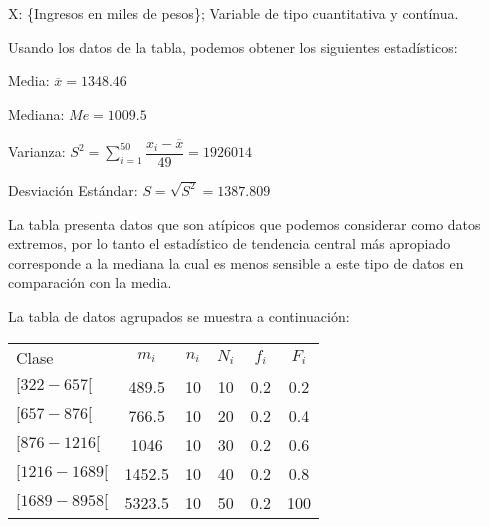 \begin{solution}
X: \{Ingresos en miles de pesos\}; Variable de tipo cuantitativa y contínua.

Usando los datos de la tabla, podemos obtener los siguientes estadísticos:

Media: $\overline{x}=1348.46$

Mediana: $Me=1009.5$

Varianza: $S^2 = \sum_{i=1}^{50} \dfrac{x_i - \overline{x}}{49}= 1926014$

Desviación Estándar: $S=\sqrt{S^2}=1387.809$

La tabla presenta datos que son atípicos que podemos considerar como datos extremos, por lo tanto el estadístico de tendencia central más apropiado corresponde a la mediana la cual es menos sensible a este tipo de datos en comparación con la media.

La tabla de datos agrupados se muestra a continuación:


\begin{center}
\begin{tabular}{lccccc}
Clase           & $m_i$  & $n_i$ & $N_i$ & $f_i$ & $F_i$ \\
$[322 - 657[$   & 489.5  & 10    & 10    & 0.2   & 0.2   \\
$[657 - 876[$   & 766.5  & 10    & 20    & 0.2   & 0.4   \\
$[876 - 1216[$  & 1046   & 10    & 30    & 0.2   & 0.6   \\
$[1216 - 1689[$ & 1452.5 & 10    & 40    & 0.2   & 0.8   \\
$[1689 - 8958[$ & 5323.5 & 10    & 50    & 0.2   & 100  
\end{tabular}
\end{center}

\end{solution}